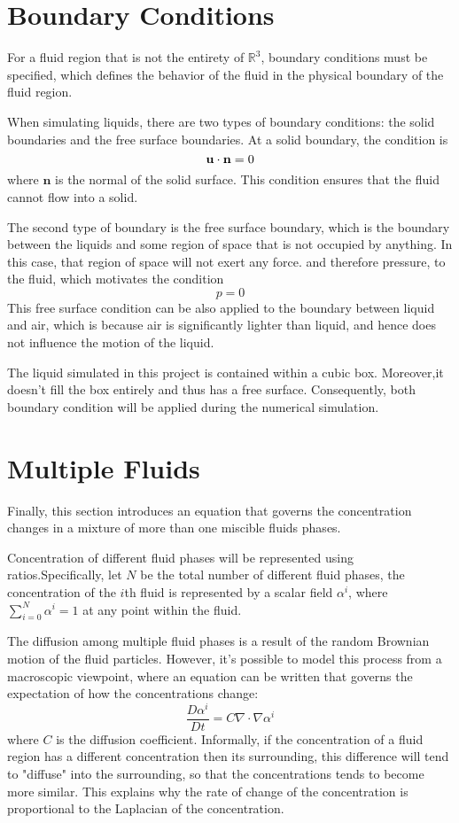 \section{Boundary Conditions}
\label{section boundary conditions}
For a fluid region that is not the entirety of $\mathbb{R}^3$, boundary conditions must be specified, which defines the behavior of the fluid in the physical boundary of the fluid region.

When simulating liquids, there are two types of boundary conditions: the solid boundaries and the free surface boundaries. At a solid boundary, the condition is 
$$
    \textbf{u} \cdot \textbf{n} = 0
$$
where $\textbf{n}$ is the normal of the solid surface. This condition ensures that the fluid cannot flow into a solid. 

The second type of boundary is the free surface boundary, which is the boundary between the liquids and some region of space that is not occupied by anything. In this case, that region of space will not exert any force. and therefore pressure, to the fluid, which motivates the condition
$$
p = 0
$$
This free surface condition can be also applied to the boundary between liquid and air, which is because air is significantly lighter than liquid, and hence does not influence the motion of the liquid.

The liquid simulated in this project is contained within a cubic box. Moreover,it doesn't fill the box entirely and thus has a free surface. Consequently, both boundary condition will be applied during the numerical simulation. 

\section{Multiple Fluids}
\label{section multiple fluids}
Finally, this section introduces an equation that governs the concentration changes in a mixture of more than one miscible fluids phases. 

Concentration of different fluid phases will be represented using ratios.Specifically, let $N$ be the total number of different fluid phases, the concentration of the $i$th fluid is represented by a scalar field $\alpha^i$, where $\sum_{i=0}^{N}\alpha^i = 1$ at any point within the fluid.

The diffusion among multiple fluid phases is a result of the random Brownian motion of the fluid particles. However, it's possible to model this process from a macroscopic viewpoint, where an equation can be written that governs the expectation of how the concentrations change:
\begin{equation}
    \tag{Advection-Diffusion Equation}
    \frac{D \alpha^i}{D t} = C\nabla \cdot \nabla \alpha^i
\end{equation}
where $C$ is the diffusion coefficient. Informally, if the concentration of a fluid region has a different concentration then its surrounding, this difference will tend to "diffuse" into the surrounding, so that the concentrations tends to become more similar. This explains why the rate of change of the concentration is proportional to the Laplacian of the concentration.

